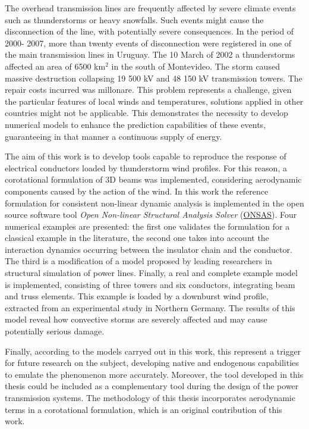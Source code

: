 \begin{foreignabstract}
The overhead transmission lines are frequently affected by severe climate events such as thunderstorms or heavy snowfalls. Such events might cause the disconnection of the line, with potentially severe consequences. In the period of 2000- 2007, more than twenty events of disconnection were registered in one of the main transmission lines in Uruguay. The 10 March of 2002 a thunderstorms affected an area of 6500 km$^2$ in the south of Montevideo. The storm caused massive destruction collapsing 19 500 kV and 48 150 kV transmission towers. The repair costs incurred was millonare. This problem represents a challenge,   given the particular features of local winds and temperatures, solutions applied in other countries might not be applicable. This demonstrates the necessity to develop numerical models to enhance the prediction capabilities of these events, guaranteeing in that manner a continuous supply of energy.

The aim of this work is to develop tools capable to reproduce the response of electrical conductors loaded by  thunderstorm wind profiles. For this reason, a corotational formulation of 3D beams was implemented, considering aerodynamic components caused by the action of the wind. In this work the reference formulation for consistent non-linear dynamic analysis is implemented in the open source software tool  \emph{Open Non-linear Structural Analysis Solver} (\href{https://github.com/ONSAS/ONSAS.m/}{ONSAS}). Four numerical examples are presented: the first one validates the formulation for a classical example in the literature, the second one takes into account the interaction dynamics occurring between the insulator chain and the conductor. The third is a modification of a model proposed by leading researchers in structural simulation of power lines.  Finally, a real and complete example model is implemented, consisting of three towers and six conductors, integrating beam and truss elements. This example is loaded by a downburst wind profile,  extracted from an experimental study in Northern Germany. The results of this model reveal how convective storms are severely affected and may cause potentially serious damage.

Finally, according to the models carryed out in this work, this represent a trigger for future research on the subject, developing native and endogenous capabilities to emulate the phenomenon more accurately. Moreover, the tool developed in this thesis could be included as a complementary tool during the design of the power transmission systems. The methodology of this thesis incorporates aerodynamic terms in a corotational formulation, which is an original contribution of this work.  

\end{foreignabstract}